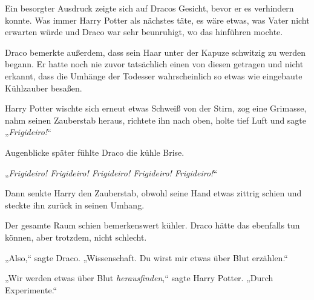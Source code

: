 Ein besorgter Ausdruck zeigte sich auf Dracos Gesicht, bevor er es verhindern konnte. Was immer Harry Potter als nächstes täte, es wäre etwas, was Vater nicht erwarten würde und Draco war sehr beunruhigt, wo das hinführen mochte.

Draco bemerkte außerdem, dass sein Haar unter der Kapuze schwitzig zu werden begann. Er hatte noch nie zuvor tatsächlich einen von diesen getragen und nicht erkannt, dass die Umhänge der Todesser wahrscheinlich so etwas wie eingebaute Kühlzauber besaßen.

Harry Potter wischte sich erneut etwas Schweiß von der Stirn, zog eine Grimasse, nahm seinen Zauberstab heraus, richtete ihn nach oben, holte tief Luft und sagte „\emph{Frigideiro!}“

Augenblicke später fühlte Draco die kühle Brise.

„\emph{Frigideiro! Frigideiro! Frigideiro! Frigideiro! Frigideiro!}“

Dann senkte Harry den Zauberstab, obwohl seine Hand etwas zittrig schien und steckte ihn zurück in seinen Umhang.

Der gesamte Raum schien bemerkenswert kühler. Draco hätte das ebenfalls tun können, aber trotzdem, nicht schlecht.

„Also,“ sagte Draco. „Wissenschaft. Du wirst mir etwas über Blut erzählen.“

„Wir werden etwas über Blut \emph{herausfinden},“ sagte Harry Potter. „Durch Experimente.“

